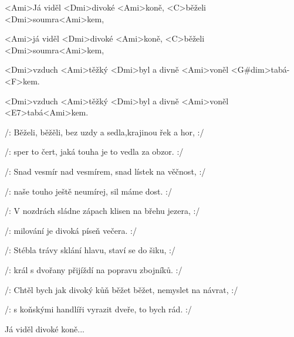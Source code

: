 

\zs
<Ami>Já viděl <Dmi>divoké <Ami>koně, <C>běželi 
<Dmi>soumra<Ami>kem, 

<Ami>já viděl <Dmi>divoké <Ami>koně, <C>běželi 
<Dmi>soumra<Ami>kem, 

<Dmi>vzduch <Ami>těžký <Dmi>byl a divně <Ami>voněl 
<G#dim>tabá-<F>kem. 

<Dmi>vzduch <Ami>těžký <Dmi>byl a divně <Ami>voněl 
<E7>tabá<Ami>kem. \ks

\zs
/: Běželi, běžěli, bez uzdy a sedla,krajinou řek a hor, :/

/: sper to čert, jaká touha je to vedla za obzor. :/
\ks

\zs
/: Snad vesmír nad vesmírem, snad lístek na věčnost, :/

/: naše touho ještě neumírej, sil máme dost. :/
\ks

\zs
/: V nozdrách sládne zápach klisen na břehu jezera, :/

/: milování je divoká píseň večera. :/
\ks

\zs
/: Stébla trávy sklání hlavu, staví se do šiku, :/

/: král s dvořany přijíždí na popravu zbojníků. :/
\ks

\zs
/: Chtěl bych jak divoký kůň běžet běžet, nemyslet na návrat, :/

/: s koňskými handlíři vyrazit dveře, to bych rád. :/
\ks



Já viděl divoké koně... \kp

